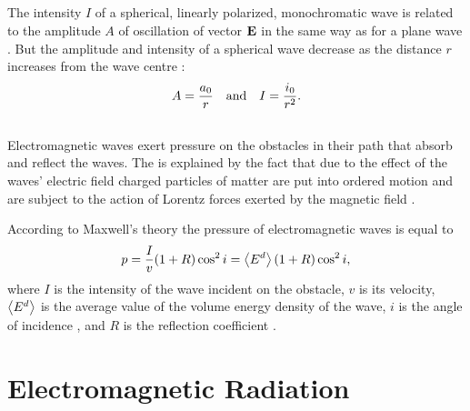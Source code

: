 \subsection{}\label{31.2.5} The intensity $I$ of a spherical, linearly polarized, monochromatic wave is related to the amplitude $A$ of oscillation of vector $\vb{E}$ in the same way as for a plane wave . But the amplitude and intensity of a spherical wave decrease as the distance $r$ increases from the wave centre :
\begin{equation*}%
A = \frac{a_{0}}{r} \qand I = \frac{i_{0}}{r^{2}}.
\end{equation*}

\subsection{}\label{31.2.6} Electromagnetic waves exert pressure on the obstacles in their path that absorb and reflect the waves. The  is explained by the fact that due to the effect of the waves' electric field charged particles of matter are put into ordered motion and are subject to the action of Lorentz forces exerted by the magnetic field .

According to Maxwell's theory the pressure of electromagnetic
waves is equal to
\begin{equation*}%
p = \frac{I}{v} (1 + R) \cos^{2} i = \expval{E^{d}} (1 + R) \cos^{2} i,
\end{equation*}
where $I$ is the intensity of the wave incident on the obstacle,
$v$ is its velocity, $\expval{E^{d}}$ is the average value of the volume energy density of the wave, $i$ is the angle of incidence , and $R$ is the reflection coefficient .

\section{Electromagnetic Radiation}
\label{sec-31.3} 


